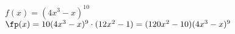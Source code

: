 {$f(x) = (4x^3-x)^{10}$\label{exer:02_05_06}
}
{$\fp(x) = 10(4x^3-x)^9\cdot(12x^2-1) = (120x^2-10)(4x^3-x)^9$
}
